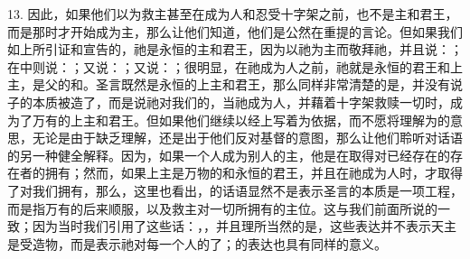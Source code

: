 13. 因此，如果他们以为救主甚至在成为人和忍受十字架之前，也不是主和君王，而是那时才开始成为主，那么让他们知道，他们是公然在重提的言论。但如果我们如上所引证和宣告的，祂是永恒的主和君王，因为以祂为主而敬拜祂，并且说：；在中则说：；又说：；又说：；很明显，在祂成为人之前，祂就是永恒的君王和上主，是父的和。圣言既然是永恒的上主和君王，那么同样非常清楚的是，并没有说子的本质被造了，而是说祂对我们的，当祂成为人，并藉着十字架救赎一切时，成为了万有的上主和君王。但如果他们继续以经上写着为依据，而不愿将理解为的意思，无论是由于缺乏理解，还是出于他们反对基督的意图，那么让他们聆听对话语的另一种健全解释。因为，如果一个人成为别人的主，他是在取得对已经存在的存在者的拥有；然而，如果上主是万物的和永恒的君王，并且在祂成为人时，才取得了对我们拥有，那么，这里也看出，的话语显然不是表示圣言的本质是一项工程，而是指万有的后来顺服，以及救主对一切所拥有的主位。这与我们前面所说的一致；因为当时我们引用了这些话：，，并且理所当然的是，这些表达并不表示天主是受造物，而是表示祂对每一个人的了；的表达也具有同样的意义。\par

